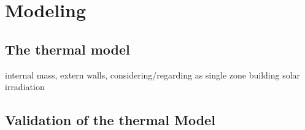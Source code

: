 \chapter{Modeling}
\label{ch:modeling}

\section{The thermal model}
\label{section:thermalmodel}
internal mass, extern walls, considering/regarding as single zone building
solar irradiation \cite{Hazyuk.2012}
\section{Validation of the thermal Model}
\label{validationthermalmodel}

%
%
%

